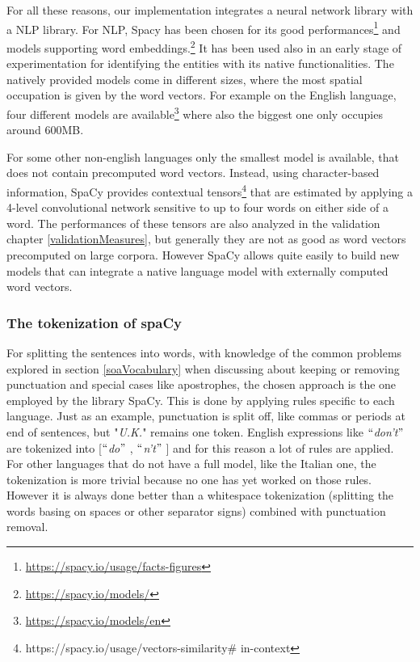 For all these reasons, our implementation integrates a neural network library with a NLP library. For NLP, Spacy has been chosen for its good performances\footnote{\url{https://spacy.io/usage/facts-figures}} and models supporting word embeddings.\footnote{\url{https://spacy.io/models/}} It has been used also in an early stage of experimentation for identifying the entities with its native functionalities. The natively provided models come in different sizes, where the most spatial occupation is given by the word vectors. For example on the English language, four different models are available\footnote{\url{https://spacy.io/models/en}} where also the biggest one only occupies around 600MB.

For some other non-english languages only the smallest model is available, that does not contain precomputed word vectors. Instead, using character-based information, SpaCy provides contextual tensors\footnote{ https://spacy.io/usage/vectors-similarity$\#$ in-context  } that are estimated by applying a 4-level convolutional network sensitive to up to four words on either side of a word. The performances of these tensors are also analyzed in the validation chapter \ref{validationMeasures}, but generally they are not as good as word vectors precomputed on large corpora. However SpaCy allows quite easily to build new models that can integrate a native language model with externally computed word vectors.

\subsubsection{The tokenization of spaCy}
For splitting the sentences into words, with knowledge of the common problems explored in section \ref{soaVocabulary} when discussing about keeping or removing punctuation and special cases like apostrophes, the chosen approach is the one employed by the library SpaCy. This is done by applying rules specific to each language. Just as an example, punctuation is split off, like commas or periods at end of sentences, but "\textit{U.K.}" remains one token. English expressions like $``$\textit{don't}$"$  are tokenized into [$``$\textit{do}$"$ , $``$\textit{n't}$"$ ] and for this reason a lot of rules are applied. For other languages that do not have a full model, like the Italian one, the tokenization is more trivial because no one has yet worked on those rules. However it is always done better than a whitespace tokenization (splitting the words basing on spaces or other separator signs) combined with punctuation removal.

